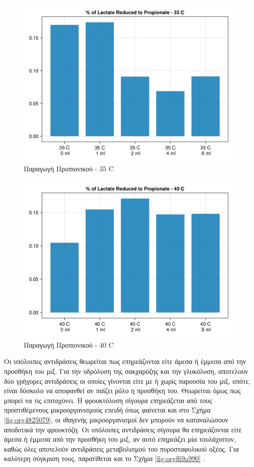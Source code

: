 \documentclass[11pt]{report}
\begin{document}
\begin{figure}[htbp]
\centering
\includegraphics[width=.9\linewidth]{../plots/metabolic_results/propionate_flux_35.png}
\caption{\label{fig:org6557e54}Παραγωγή Προπιονικού - 35 C}
\end{figure}

\begin{figure}[htbp]
\centering
\includegraphics[width=.9\linewidth]{../plots/metabolic_results/propionate_flux_40.png}
\caption{\label{fig:orgf163124}Παραγωγή Προπιονικού - 40 C}
\end{figure}

Οι υπόλοιπες αντιδράσεις θεωρείται πως επηρεάζονται είτε άμεσα ή έμμεσα από την προσθήκη του μιξ. Για την υδρόλυση της σακχαρόζης και την γλυκόλυση, αποτελούν δύο γρήγορες αντιδράσεις οι οποίες γίνονται είτε με ή χωρίς παρουσία του μιξ, οπότε, είναι δύσκολο να αποφανθεί αν παίζει ρόλο η προσθήκη του. Θεωρείται όμως πως μπορεί να τις επιταχύνει. Η φρουκτόλυση σίγουρα επηρεάζεται από τους προστιθέμενους μικροοργανισμούς επειδή όπως φαίνεται και στο Σχήμα \ref{fig:org4825079}, οι ιθαγενής μικροοργανισμοί δεν μπορούν να καταναλώσουν αποδοτικά την φρουκτόζη. Οι υπόλοιπες αντιδράσεις σίγουρα θα επηρεάζονται είτε άμεσα ή έμμεσα από την προσθήκη του μιξ, αν αυτό επηρεάζει μία τουλάχιστον, καθώς όλες αποτελούν αντιδράσεις μεταβολισμού του πυροσταφυλικού οξέος. Για καλύτερη σύγκριση τους, παρατίθεται και το Σχήμα \ref{fig:orgf69a990} . 
\end{document}
